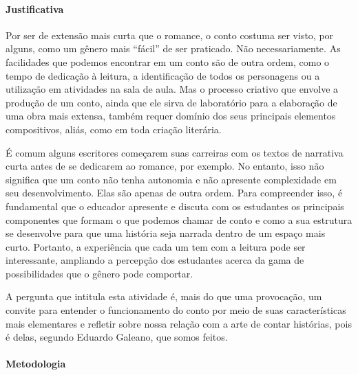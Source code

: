 \documentclass[12pt]{extarticle}
\begin{document}
\paragraph{Justificativa} Por ser de extensão mais curta que o romance, o
conto costuma ser visto, por alguns, como um gênero mais ``fácil'' de
ser praticado. Não necessariamente. As facilidades que podemos encontrar
em um conto são de outra ordem, como o tempo de dedicação à leitura, a
identificação de todos os personagens ou a utilização em atividades na
sala de aula. Mas o processo criativo que envolve a produção de um
conto, ainda que ele sirva de laboratório para a elaboração de uma obra
mais extensa, também requer domínio dos seus principais elementos
compositivos, aliás, como em toda criação literária.

É comum alguns escritores começarem suas carreiras com os textos de
narrativa curta antes de se dedicarem ao romance, por exemplo. No
entanto, isso não significa que um conto não tenha autonomia e não
apresente complexidade em seu desenvolvimento. Elas são apenas de outra
ordem. Para compreender isso, é fundamental que o educador apresente e
discuta com os estudantes os principais componentes que formam o que
podemos chamar de conto e como a sua estrutura se desenvolve para que
uma história seja narrada dentro de um espaço mais curto. Portanto, a
experiência que cada um tem com a leitura pode ser interessante,
ampliando a percepção dos estudantes acerca da gama de possibilidades
que o gênero pode comportar.

A pergunta que intitula esta atividade é, mais do que uma provocação, um
convite para entender o funcionamento do conto por meio de suas
características mais elementares e refletir sobre nossa relação com a
arte de contar histórias, pois é delas, segundo Eduardo Galeano, que
somos feitos.

\paragraph{Metodologia} 
\end{document}
